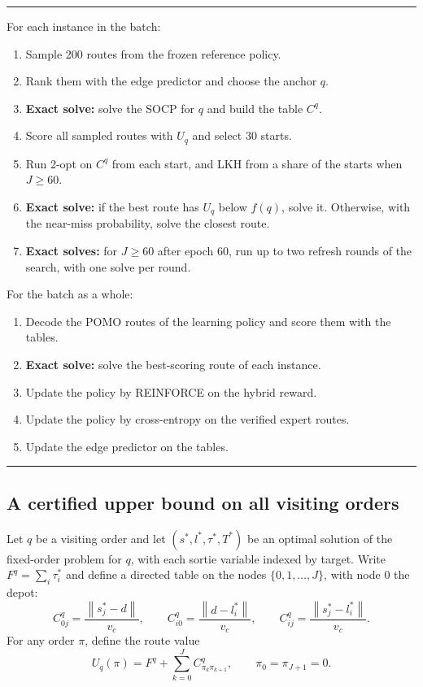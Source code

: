 \documentclass[preprint,12pt,authoryear]{elsarticle}
\newcommand{\norm}[1]{\left\lVert #1 \right\rVert}
\begin{document}
\begin{table}[t]
\caption{One training step for a batch of instances. Exact solves are marked.}
\label{alg:train}
\small
\hrule\smallskip
\noindent For each instance in the batch:
\begin{enumerate}
\setlength{\itemsep}{0pt}
\item Sample 200 routes from the frozen reference policy.
\item Rank them with the edge predictor and choose the anchor $q$.
\item \textbf{Exact solve:} solve the SOCP for $q$ and build the table $C^{q}$.
\item Score all sampled routes with $U_{q}$ and select 30 starts.
\item Run 2-opt on $C^{q}$ from each start, and LKH from a share of the starts when $J \ge 60$.
\item \textbf{Exact solve:} if the best route has $U_{q}$ below $f(q)$, solve it. Otherwise, with the near-miss probability, solve the closest route.
\item \textbf{Exact solves:} for $J \ge 60$ after epoch 60, run up to two refresh rounds of the search, with one solve per round.
\end{enumerate}
\noindent For the batch as a whole:
\begin{enumerate}
\setlength{\itemsep}{0pt}
\setcounter{enumi}{7}
\item Decode the POMO routes of the learning policy and score them with the tables.
\item \textbf{Exact solve:} solve the best-scoring route of each instance.
\item Update the policy by REINFORCE on the hybrid reward.
\item Update the policy by cross-entropy on the verified expert routes.
\item Update the edge predictor on the tables.
\end{enumerate}
\hrule
\end{table}

\subsection{A certified upper bound on all visiting orders}

Let $q$ be a visiting order and let $(s^{*},l^{*},\tau^{*},T^{*})$ be an optimal solution of the fixed-order problem for $q$, with each sortie variable indexed by target. Write $F^{q} = \sum_{i} \tau^{*}_{i}$ and define a directed table on the nodes $\{0,1,\dots,J\}$, with node $0$ the depot:
\begin{equation}
C^{q}_{0j} = \frac{\norm{s^{*}_{j} - d}}{v_{c}}, \qquad
C^{q}_{i0} = \frac{\norm{d - l^{*}_{i}}}{v_{c}}, \qquad
C^{q}_{ij} = \frac{\norm{s^{*}_{j} - l^{*}_{i}}}{v_{c}} .
\end{equation}
For any order $\pi$, define the route value
\begin{equation}
U_{q}(\pi) = F^{q} + \sum_{k=0}^{J} C^{q}_{\pi_{k}\pi_{k+1}}, \qquad \pi_{0} = \pi_{J+1} = 0 .
\end{equation}
\end{document}
